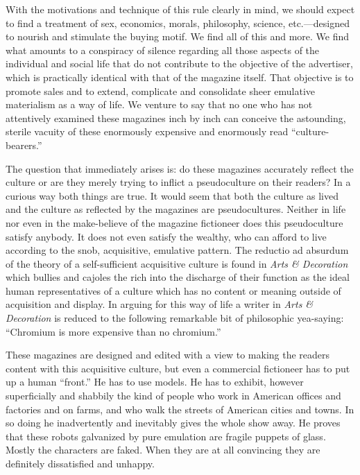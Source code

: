 \documentclass[nohyper,openany,nobib]{tufte-book}
\begin{document}
With the motivations and technique of this rule clearly in mind, we
should expect to find a treatment of sex, economics, morals, philosophy,
science, etc.---designed to nourish and stimulate the buying motif. We
find all of this and more. We find what amounts to a conspiracy of
silence regarding all those aspects of the individual and social life
that do not contribute to the objective of the advertiser, which is
practically identical with that of the magazine itself. That objective
is to promote sales and to extend, complicate and consolidate sheer
emulative materialism as a way of life. We venture to say that no one
who has not attentively examined these magazines inch by inch can
conceive the astounding, sterile vacuity of these enormously expensive
and enormously read ``culture-bearers.''

The question that immediately arises is: do these magazines accurately
reflect the culture or are they merely trying to inflict a pseudoculture
on their readers? In a curious way both things are true. It would seem
that both the culture as lived and the culture as reflected by the
magazines are pseudocultures. Neither in life nor even in the
make-believe of the magazine fictioneer does this pseudoculture satisfy
anybody. It does not even satisfy the wealthy, who can afford to live
according to the snob, acquisitive, emulative pattern. The reductio ad
absurdum of the theory of a self-sufficient acquisitive culture is found
in \emph{Arts \& Decoration} which bullies and cajoles the rich into the
discharge of their function as the ideal human representatives of a
culture which has no content or meaning outside of acquisition and
display. In arguing for this way of life a writer in \emph{Arts \&
Decoration} is reduced to the following remarkable bit of philosophic
yea-saying: ``Chromium is more expensive than no chromium.''

These magazines are designed and edited with a view to making the
readers content with this acquisitive culture, but even a commercial
fictioneer has to put up a human ``front.'' He has to use models. He has
to exhibit, however superficially and shabbily the kind of people who
work in American offices and factories and on farms, and who walk the
streets of American cities and towns. In so doing he inadvertently and
inevitably gives the whole show away. He proves that these robots
galvanized by pure emulation are fragile puppets of glass. Mostly the
characters are faked. When they are at all convincing they are
definitely dissatisfied and unhappy.
\end{document}

